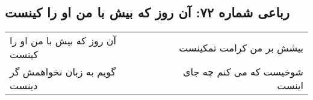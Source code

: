 \begin{center}
\section*{رباعی شماره ۷۲: آن روز که بیش با من او را کینست}
\label{sec:sh072}
\begin{longtable}{l p{0.5cm} r}
آن روز که بیش با من او را کینست
&&
بیشش بر من کرامت تمکینست
\\
گویم به زبان نخواهمش گر دینست
&&
شوخیست که می کنم چه جای اینست
\\
\end{longtable}
\end{center}
